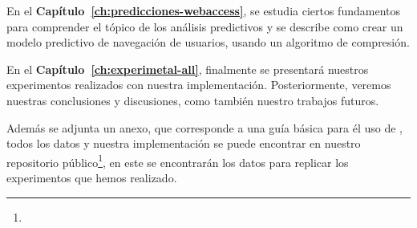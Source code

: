 En el \textbf{Capítulo~\ref{ch:predicciones-webaccess}}, se estudia ciertos fundamentos para comprender el tópico de los análisis predictivos y se describe como crear un modelo predictivo de navegación de usuarios, usando un algoritmo de compresión.





En el \textbf{Capítulo~\ref{ch:experimetal-all}}, finalmente se presentará nuestros experimentos realizados con nuestra implementación. Posteriormente, veremos nuestras conclusiones y discusiones, como también nuestro trabajos futuros.





Además se adjunta un anexo, que corresponde a una guía básica para él uso de \predictionio, todos los datos y nuestra implementación se puede encontrar en nuestro repositorio público\footnote{\footnotePublicRepo}, en este se encontrarán los datos para replicar los experimentos que hemos realizado. 



